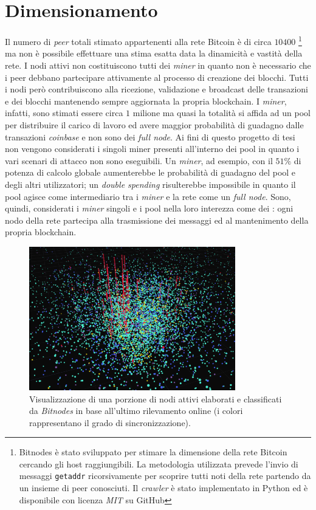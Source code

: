 \section{Dimensionamento}
Il numero di \textit{peer} totali stimato appartenenti alla rete Bitcoin è di circa $10400$ \cite{bitnodes}\footnote{Bitnodes è stato sviluppato per stimare la dimensione della rete Bitcoin cercando gli host raggiungibili. La metodologia utilizzata prevede l'invio di messaggi \texttt{getaddr} ricorsivamente per scoprire tutti noti della rete partendo da un insieme di peer conosciuti. Il \textit{crawler} è stato implementato in Python ed è disponibile con licenza \textit{MIT} su GitHub} ma non è possibile effettuare una stima esatta data la dinamicità e vastità della rete. I nodi attivi non costituiscono tutti dei \textit{miner} in quanto non è necessario che i peer debbano partecipare attivamente al processo di creazione dei blocchi. Tutti i nodi però contribuiscono alla ricezione, validazione e broadcast delle transazioni e dei blocchi mantenendo sempre aggiornata la propria blockchain. I \textit{miner}, infatti, sono stimati essere circa $1$ milione ma quasi la totalità si affida ad un pool per distribuire il carico di lavoro ed avere maggior probabilità di guadagno dalle transazioni \textit{coinbase} e non sono dei \textit{full node}.\newline
Ai fini di questo progetto di tesi non vengono considerati i singoli miner presenti all'interno dei pool in quanto i vari scenari di attacco non sono eseguibili. Un \textit{miner}, ad esempio, con il $51\%$ di potenza di calcolo globale aumenterebbe le probabilità di guadagno del pool e degli altri utilizzatori; un \textit{double spending} risulterebbe impossibile in quanto il pool agisce come intermediario tra i \textit{miner} e la rete come un \textit{full node}.\newline
Sono, quindi, considerati i \textit{miner} singoli e i pool nella loro interezza come dei : ogni nodo della rete partecipa alla trasmissione dei messaggi ed al mantenimento della propria blockchain.
\begin{figure}[H]
    \centering
    \includegraphics[width=0.8\textwidth]{images/bitnodes.png}
    \caption{Visualizzazione di una porzione di nodi attivi elaborati e classificati da \textit{Bitnodes} in base all'ultimo rilevamento online (i colori rappresentano il grado di sincronizzazione).}
\end{figure}
